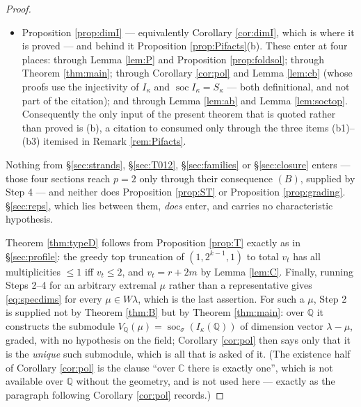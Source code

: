 \documentclass[reqno]{amsart}
\theoremstyle{plain}
\theoremstyle{definition}
\DeclareMathOperator{\soc}{soc}
\newcommand{\la}{\lambda}
\newcommand{\ka}{\kappa}
\begin{document}
\begin{proof}
\begin{itemize}
\ref{lem:cbseq} and Proposition \ref{prop:ext1}, Lemma \ref{lem:cb}, Corollary
\ref{cor:mono}, Corollary \ref{cor:pol}, Lemma \ref{lem:extend}, Theorem
\ref{thm:main} with its equation \eqref{eq:lower}, and Corollary
\ref{cor:prefix}.
\item Proposition \ref{prop:dimI} --- equivalently Corollary
\ref{cor:dimI}, which is where it is proved --- and behind it Proposition
\ref{prop:Pifacts}\textup{(b)}.  These enter at four places:
through Lemma \ref{lem:P} and Proposition \ref{prop:foldsol}; through Theorem
\ref{thm:main}; through Corollary \ref{cor:pol} and Lemma \ref{lem:cb} (whose
proofs use the injectivity of $I_\ka$ and $\soc I_\ka=S_\ka$ --- both
definitional, and not part of the citation); and through Lemma \ref{lem:ab}
and Lemma \ref{lem:soctop}.  Consequently the only input of the present
theorem that is quoted rather than proved is \textup{(b)}, a citation to
\cite{BBK} consumed only through the three items \textup{(b1)}--\textup{(b3)}
itemised in Remark \ref{rem:Pifacts}.
\end{itemize}
Nothing from \S\ref{sec:strands}, \S\ref{sec:T012}, \S\ref{sec:families} or
\S\ref{sec:closure} enters --- those four sections reach $p=2$ only through
their consequence $(B)$, supplied by Step 4 --- and neither does Proposition
\ref{prop:ST} or Proposition \ref{prop:grading}.
\S\ref{sec:reps}, which lies between them, \emph{does} enter, and carries no
characteristic hypothesis.

Theorem \ref{thm:typeD} follows from Proposition
\ref{prop:T} exactly as in \S\ref{sec:profile}: the greedy top truncation of
$(1,2^{k-1},1)$ to total $v_t$ has all multiplicities $\le1$ iff $v_t\le2$,
and $v_t=r+2m$ by Lemma \ref{lem:C}.  Finally, running Steps 2--4 for an
arbitrary extremal $\mu$ rather than a representative gives
\eqref{eq:specdims} for every $\mu\in W\la$, which is the last assertion.  For
such a $\mu$, Step 2 is supplied not by Theorem \ref{thm:B} but by Theorem
\ref{thm:main}: over $\mathbb{Q}$ it constructs the submodule
$V_{\mathbb{Q}}(\mu)=\soc_\sigma(I_\ka(\mathbb{Q}))$ of dimension vector
$\la-\mu$, graded, with no hypothesis on the field; Corollary \ref{cor:pol}
then says only that it is the \emph{unique} such submodule, which is all that
is asked of it.  (The existence half of Corollary \ref{cor:pol} is the clause
``over $\mathbb{C}$ there is exactly one'', which is not available over
$\mathbb{Q}$ without the geometry, and is not used here --- exactly as the
paragraph following Corollary \ref{cor:pol} records.)
\end{proof}
\end{document}
